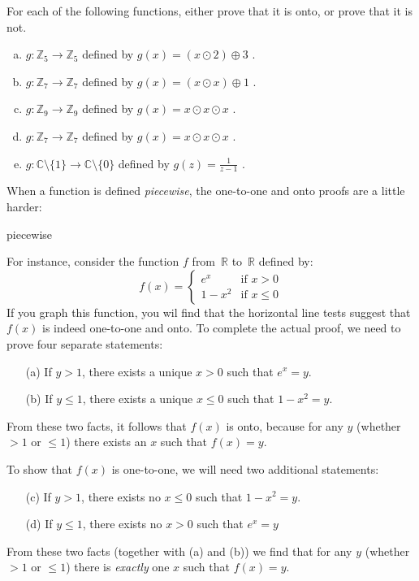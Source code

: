 \begin{exercise}{}
For each of the following  functions, either prove that it is onto, or prove that it is not.
\begin{enumerate}[(a)]
\item \label{modular_m3}
 $g \colon {\mathbb Z}_5 \to {\mathbb Z}_{5}$ defined by $g(x) =  (x \odot 2) \oplus 3$ .
\item 
 $g \colon {\mathbb Z}_7 \to {\mathbb Z}_7$ defined by $g(x)= (x \odot x) \oplus 1 $ .
\item 
 $g \colon {\mathbb Z}_9 \to {\mathbb Z}_9$ defined by $g(x)= x \odot x \odot x$ .
\item 
 $g \colon {\mathbb Z}_7 \to {\mathbb Z}_7$ defined by $g(x)= x \odot x \odot x$ .
\item
 $g \colon {\mathbb C}\setminus \{1\}  \to {\mathbb C}\setminus \{0\} $ defined by $g(z) =  \frac{1}{z-1}$ .
\end{enumerate}
\end{exercise}

When a function is defined \emph{piecewise}, the one-to-one and  onto proofs are a little harder:

\begin{example}{piecewise}

  For instance, consider the function $f$ from~$\mathbb{R}$ to~$\mathbb{R}$ defined by:
$$ f(x) = 
\begin{cases}
e^x & \mbox{if $x > 0$} \\
1 - x^2 & \mbox{if $x \le 0$}
\end{cases} $$
If you graph this function, you wil find that the horizontal line tests suggest that  $f(x)$ is indeed one-to-one and onto. To complete the actual proof, we need to prove four separate statements:
\begin{enumerate}[(a)] 
\item[(a)]
If $y > 1$, there exists a unique $x>0$ such that $e^x = y$.
\item[(b)]
If $y \le 1$, there exists a unique $x \le 0$ such that $1-x^2 = y$.
\end{enumerate}
From these two facts, it follows that $f(x)$ is onto, because for any $y$ (whether $>1$ or $\le 1$) there exists an $x$ such that $f(x)=y$. 
\bigskip


To show that $f(x)$ is one-to-one, we will need two additional statements:
\begin{enumerate}[(a)]
\setcounter{enumi}{2} 
\item[(c)]
If $y > 1$, there exists no $x\le0$ such that $1 - x^2 = y$.
\item[(d)]
If $y \le 1$, there exists no $x > 0$ such that $e^x = y$
\end{enumerate}
From these two facts (together with (a) and (b)) we find that for any $y$ (whether $>1$ or $\le 1$) there is \emph{exactly} one $x$ such that $f(x)=y$.
\end{example}
 
